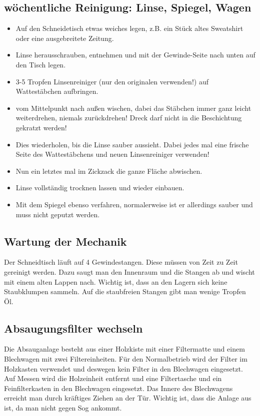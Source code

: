 \documentclass{\basedir/fablab-document}
\begin{document}
\subsection{wöchentliche Reinigung: Linse, Spiegel, Wagen}
\begin{itemize}
\label{linsenreinigung}
 \item Auf den Schneidetisch etwas weiches legen, z.B. ein Stück altes Sweatshirt oder eine ausgebreitete Zeitung.
 \item Linse herausschrauben, entnehmen und mit der Gewinde-Seite nach unten auf den Tisch legen.
 \item 3-5 Tropfen Linsenreiniger (nur den originalen verwenden!) auf Wattestäbchen aufbringen.
 \item vom Mittelpunkt nach außen wischen, dabei das Stäbchen immer ganz leicht weiterdrehen, niemals zurückdrehen! Dreck darf nicht in die Beschichtung gekratzt werden!
 \item Dies wiederholen, bis die Linse sauber aussieht. Dabei jedes mal eine frische Seite des Wattestäbchens und neuen Linsenreiniger verwenden!
 \item Nun ein letztes mal im Zickzack die ganze Fläche abwischen.
 \item Linse vollständig trocknen lassen und wieder einbauen.
 \item Mit dem Spiegel ebenso verfahren, normalerweise ist er allerdings sauber und muss nicht geputzt werden.
\end{itemize}

\subsection{Wartung der Mechanik}
Der Schneidtisch läuft auf 4 Gewindestangen. Diese müssen von Zeit zu Zeit gereinigt werden. Dazu saugt man den Innenraum und die Stangen ab und wischt mit einem alten Lappen nach. Wichtig ist, dass an den Lagern sich keine Staubklumpen sammeln. Auf die staubfreien Stangen gibt man wenige Tropfen Öl.
\subsection{Absaugungsfilter wechseln}
Die Absauganlage besteht aus einer Holzkiste mit einer Filtermatte und einem Blechwagen mit zwei Filtereinheiten. Für den Normalbetrieb wird der Filter im Holzkasten verwendet und deswegen kein Filter in den Blechwagen eingesetzt. Auf Messen wird die Holzeinheit entfernt und eine Filtertasche und ein Feinfilterkasten in den Blechwagen eingesetzt. Das Innere des Blechwagens erreicht man durch kräftiges Ziehen an der Tür. Wichtig ist, dass die Anlage aus ist, da man nicht gegen Sog ankommt.
\end{document}
